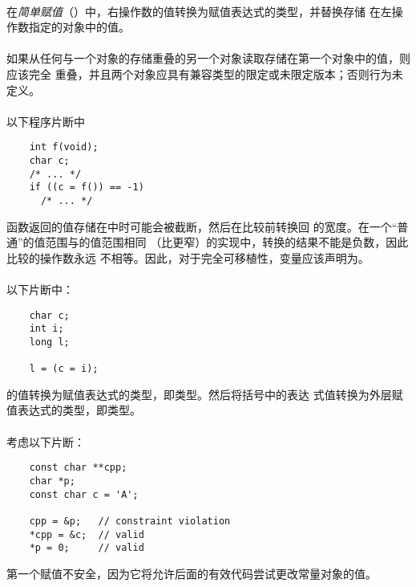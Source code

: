 {\semantic
\paragraph{}
在\textit{简单赋值}（\tm{=}）中，右操作数的值转换为赋值表达式的类型，并替换存储
在左操作数指定的对象中的值。

\paragraph{}
如果从任何与一个对象的存储重叠的另一个对象读取存储在第一个对象中的值，则应该完全
重叠，并且两个对象应具有兼容类型的限定或未限定版本；否则行为未定义。

\paragraph{}
\ex 以下程序片断中
\begin{lstlisting}
    int f(void);
    char c;
    /* ... */
    if ((c = f()) == -1)
      /* ... */
\end{lstlisting}
函数返回的值存储在中时可能会被截断，然后在比较前转换回
的宽度。在一个``普通''的值范围与的值范围相同
（比更窄）的实现中，转换的结果不能是负数，因此比较的操作数永远
不相等。因此，对于完全可移植性，变量应该声明为。

\paragraph{}
\ex 以下片断中：
\begin{lstlisting}
    char c;
    int i;
    long l;

    l = (c = i);
\end{lstlisting}
的值转换为赋值表达式的类型，即类型。然后将括号中的表达
式值转换为外层赋值表达式的类型，即类型。

\paragraph{}
\ex 考虑以下片断：
\begin{lstlisting}
    const char **cpp;
    char *p;
    const char c = 'A';

    cpp = &p;   // constraint violation
    *cpp = &c;  // valid
    *p = 0;     // valid
\end{lstlisting}
第一个赋值不安全，因为它将允许后面的有效代码尝试更改常量对象的值。

}
